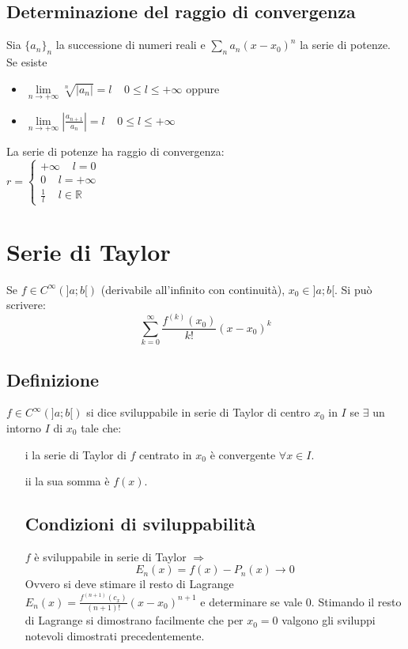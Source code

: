 \subsection{Determinazione del raggio di convergenza}
Sia $\{a_n\}_n$ la successione di numeri reali e $\sum\limits_n a_n(x-x_0)^n$ la serie di potenze. Se esiste
\begin{itemize}
\item $\lim\limits_{n\rightarrow+\infty}\sqrt[n]{|a_n|}=l\;\;\;\;0\le l\le+\infty$ oppure
\item $\lim\limits_{n\rightarrow+\infty}|\frac{a_{n+1}}{a_n}|=l\;\;\;\;0\le l\le+\infty$
\end{itemize}
La serie di potenze ha raggio di convergenza:\\
$r=\begin{cases}
+\infty\;\;\;\; l=0\\
0\;\;\;\;l=+\infty\\
\frac{1}{l}\;\;\;\;l\in\mathbb{R}
\end{cases}
$
\section{Serie di Taylor}
Se $f\in C^\infty(]a;b[)$ (derivabile all'infinito con continuit\`a), $x_0\in]a;b[$. Si pu\`o scrivere:
\begin{equation}
\sum\limits_{k=0}^\infty \dfrac{f^{(k)}(x_0)}{k!}(x-x_0)^k
\end{equation}
\subsection{Definizione}
$f\in C^\infty(]a;b[)$ si dice sviluppabile in serie di Taylor di centro $x_0$ in $I$ se $\exists$ un intorno $I$ di $x_0$ tale che:
\begin{itemize}
\item[i] la serie di Taylor di $f$ centrato in $x_0$ \`e convergente $\forall x\in I$.
\item[ii] la sua somma \`e $f(x)$.
\subsection{Condizioni di sviluppabilit\`a}
$f$ \`e sviluppabile in serie di Taylor $\Rightarrow$
\begin{equation}
E_n(x)=f(x)-P_n(x)\rightarrow 0
\end{equation}
Ovvero si deve stimare il resto di Lagrange $E_n(x)=\frac{f^{(n+1)}(c_x)}{(n+1)!}(x-x_0)^{n+1}$ e determinare se vale $0$. Stimando il resto di Lagrange si dimostrano facilmente
che per $x_0=0$ valgono gli sviluppi notevoli dimostrati precedentemente.
\end{itemize}